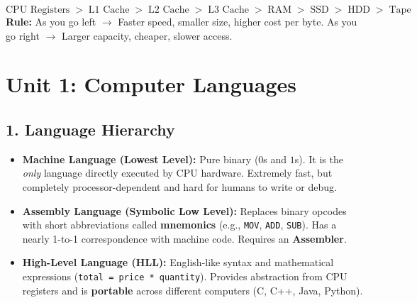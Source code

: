\documentclass[a4paper,11pt]{article}
\begin{document}
\begin{handwbox}
\[
\text{CPU Registers} \;>\; \text{L1 Cache} \;>\; \text{L2 Cache} \;>\; \text{L3 Cache} \;>\; \text{RAM} \;>\; \text{SSD} \;>\; \text{HDD} \;>\; \text{Tape}
\]
\textbf{Rule:} As you go left $\rightarrow$ Faster speed, smaller size, higher cost per byte. As you go right $\rightarrow$ Larger capacity, cheaper, slower access.
\end{handwbox}

\newpage

\section{Unit 1: Computer Languages}

\subsection{1. Language Hierarchy}
\begin{conceptbox}
\begin{itemize}[leftmargin=5mm]
    \item \textbf{Machine Language (Lowest Level):} Pure binary ($0$s and $1$s). It is the \textit{only} language directly executed by CPU hardware. Extremely fast, but completely processor-dependent and hard for humans to write or debug.
    \item \textbf{Assembly Language (Symbolic Low Level):} Replaces binary opcodes with short abbreviations called \textbf{mnemonics} (e.g., \texttt{MOV}, \texttt{ADD}, \texttt{SUB}). Has a nearly 1-to-1 correspondence with machine code. Requires an \textbf{Assembler}.
    \item \textbf{High-Level Language (HLL):} English-like syntax and mathematical expressions (\texttt{total = price * quantity}). Provides abstraction from CPU registers and is \textbf{portable} across different computers (C, C++, Java, Python).
\end{itemize}
\end{conceptbox}
\end{document}
